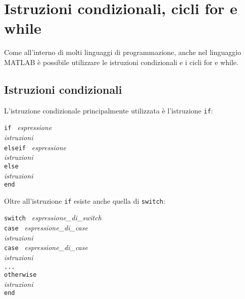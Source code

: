 \chapter{Istruzioni condizionali, cicli for e while}
Come all'interno di molti linguaggi di programmazione, anche nel linguaggio MATLAB è possibile utilizzare le istruzioni 
condizionali e i cicli for e while.

\section{Istruzioni condizionali}
L'istruzione condizionale principalmente utilizzata è l'istruzione \texttt{if}: \break

\begin{center}
\texttt{if } \textit{espressione} \\ 
\hspace{1.5cm}\textit{istruzioni}  \\
\hspace{1cm}\texttt{elseif } \textit{espressione} \\ 
\hspace{1.4cm}\textit{istruzioni}  \\
\hspace{-1.8cm}\texttt{else} \\ 
\hspace{1.4cm}\textit{istruzioni}  \\
\hspace{-2cm}\texttt{end}
\end{center}

Oltre all'istruzione  \texttt{if} esiste anche quella di \texttt{switch}:

\begin{center}
\texttt{switch } \textit{espressione\_di\_switch} \\ 
\hspace{1cm}\texttt{case } \textit{espressione\_di\_case} \\ 
\hspace{1.4cm}\textit{istruzioni}  \\
\hspace{1cm}\texttt{case } \textit{espressione\_di\_case} \\ 
\hspace{1.4cm}\textit{istruzioni}  \\
\hspace{2cm} \texttt{...} \\
\hspace{-2cm}\texttt{otherwise } \\ 
\hspace{1.4cm}\textit{istruzioni}  \\
\hspace{-5cm}\texttt{end}
\end{center}


